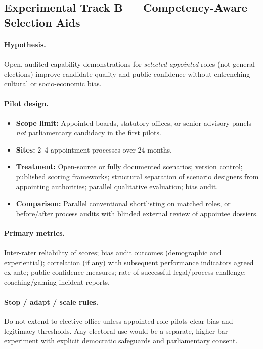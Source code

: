 \documentclass[11pt,a4paper]{article}
\begin{document}
\subsection{Experimental Track B --- Competency-Aware Selection Aids}

\paragraph{Hypothesis.}
Open, audited capability demonstrations for \emph{selected appointed} roles (not general elections) improve candidate quality and public confidence without entrenching cultural or socio-economic bias.

\paragraph{Pilot design.}
\begin{itemize}[leftmargin=*]
    \item \textbf{Scope limit:} Appointed boards, statutory offices, or senior advisory panels---\emph{not} parliamentary candidacy in the first pilots.
    \item \textbf{Sites:} 2--4 appointment processes over 24 months.
    \item \textbf{Treatment:} Open-source or fully documented scenarios; version control; published scoring frameworks; structural separation of scenario designers from appointing authorities; parallel qualitative evaluation; bias audit.
    \item \textbf{Comparison:} Parallel conventional shortlisting on matched roles, or before/after process audits with blinded external review of appointee dossiers.
\end{itemize}

\paragraph{Primary metrics.}
Inter-rater reliability of scores; bias audit outcomes (demographic and experiential); correlation (if any) with subsequent performance indicators agreed ex ante; public confidence measures; rate of successful legal/process challenge; coaching/gaming incident reports.

\paragraph{Stop / adapt / scale rules.}
Do not extend to elective office unless appointed-role pilots clear bias and legitimacy thresholds. Any electoral use would be a separate, higher-bar experiment with explicit democratic safeguards and parliamentary consent.
\end{document}
